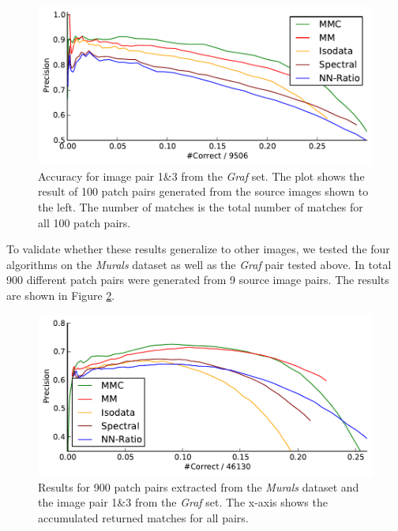 \documentclass[conference]{IEEEtran}
\begin{document}
\begin{figure}[htb]
			\centering
			\includegraphics[width=0.6\columnwidth]{images/result_graf}
	\caption{Accuracy for image pair 1\&3 from the \emph{Graf} set. The plot 
		shows the result of 100 patch pairs generated from the source 
		images shown to the left. The number of matches is the total 
		number of matches for all 100 patch pairs.}
	\label{fig:result_graf}
\end{figure}

To validate whether these results 
generalize to other images, we tested the four algorithms on the 
\emph{Murals} dataset as well as the \emph{Graf} pair tested above.  
In total 900 different patch pairs were generated from 9 
source image pairs.  The results are shown in Figure 
\ref{fig:result_accumulated}. 

\begin{figure}[htb]
	\centering
	\includegraphics[width=\columnwidth]{images/result_accumulated}
	\caption{Results for 900 patch pairs extracted from the \emph{Murals} dataset and the image pair 1\&3 from the \emph{Graf} set.  The x-axis shows the accumulated returned matches for all pairs.}
	\label{fig:result_accumulated}
\end{figure}
\end{document}
